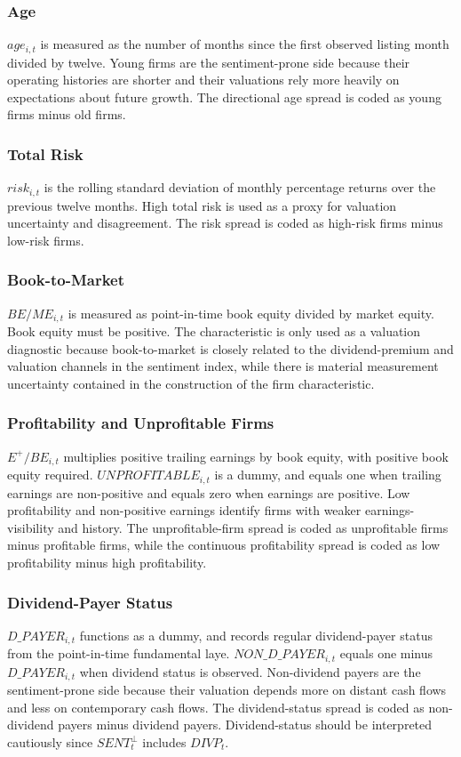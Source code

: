\documentclass[11pt]{article}
\newcommand{\var}[1]{\ensuremath{#1}}
\begin{document}
\subsubsection{Age}
\var{age_{i,t}} is measured as the number of months since the first observed listing month divided by twelve. Young firms are the sentiment-prone side because their operating histories are shorter and their valuations rely more heavily on expectations about future growth. The directional age spread is coded as young firms minus old firms.

\subsubsection{Total Risk}
\var{risk_{i,t}} is the rolling standard deviation of monthly percentage returns over the previous twelve months. High total risk is used as a proxy for valuation uncertainty and disagreement. The risk spread is coded as high-risk firms minus low-risk firms.

\subsubsection{Book-to-Market}
\var{BE/ME_{i,t}} is measured as point-in-time book equity divided by market equity. Book equity must be positive. The characteristic is only used as a valuation diagnostic because book-to-market is closely related to the dividend-premium and valuation channels in the sentiment index, while there is material measurement uncertainty contained in the construction of the firm characteristic.

\subsubsection{Profitability and Unprofitable Firms}
\var{E^+/BE_{i,t}} multiplies positive trailing earnings by book equity, with positive book equity required. \var{UNPROFITABLE_{i,t}} is a dummy, and equals one when trailing earnings are non-positive and equals zero when earnings are positive. Low profitability and non-positive earnings identify firms with weaker earnings-visibility and history. The unprofitable-firm spread is coded as unprofitable firms minus profitable firms, while the continuous profitability spread is coded as low profitability minus high profitability.

\subsubsection{Dividend-Payer Status}
\var{D\_PAYER_{i,t}} functions as a dummy, and records regular dividend-payer status from the point-in-time fundamental laye. \var{NON\_D\_PAYER_{i,t}} equals one minus \var{D\_PAYER_{i,t}} when dividend status is observed. Non-dividend payers are the sentiment-prone side because their valuation depends more on distant cash flows and less on contemporary cash flows. The dividend-status spread is coded as non-dividend payers minus dividend payers. Dividend-status should be interpreted cautiously since \var{SENT^{\perp}_{t}} includes \var{DIVP_t}.
\end{document}
